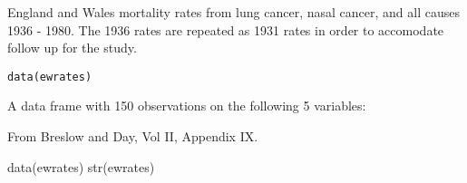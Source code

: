 \begin{Description}\relax
England and Wales mortality rates from lung cancer, nasal cancer,
and all causes 1936 - 1980. The 1936 rates are repeated as 1931 rates in
order to accomodate follow up for the  study.
\end{Description}
\begin{Usage}
\begin{verbatim}data(ewrates)\end{verbatim}
\end{Usage}
\begin{Format}\relax
A data frame with 150 observations on the following 5 variables:
\end{Format}
\begin{Source}\relax
From Breslow and Day, Vol II, Appendix IX.
\end{Source}
\begin{Examples}
\begin{ExampleCode}
data(ewrates)
str(ewrates)
\end{ExampleCode}
\end{Examples}

